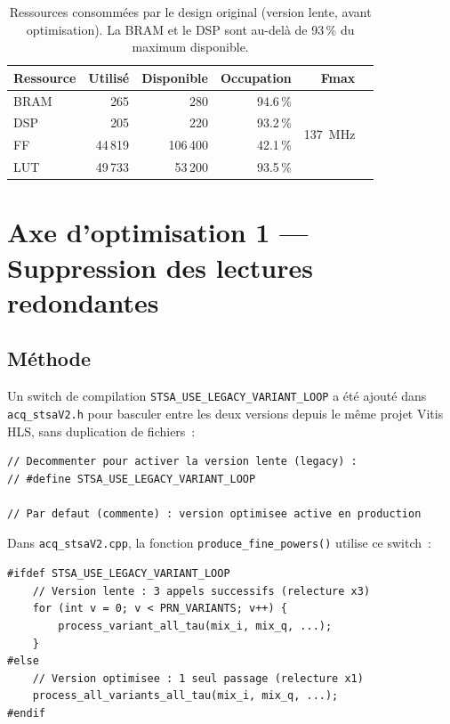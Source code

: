 \documentclass[11pt,a4paper]{article}
\begin{document}
\begin{table}[H]
\centering
\renewcommand{\arraystretch}{1.3}
\begin{tabular}{lrrrrl}
\toprule
\textbf{Ressource} & \textbf{Utilisé} & \textbf{Disponible} & \textbf{Occupation} & \textbf{Fmax} \\
\midrule
BRAM & 265 & 280 & 94.6\,\% & \multirow{4}{*}{137~MHz} \\
DSP  & 205 & 220 & 93.2\,\% & \\
FF   & 44\,819 & 106\,400 & 42.1\,\% & \\
LUT  & 49\,733 & 53\,200 & 93.5\,\% & \\
\bottomrule
\end{tabular}
\caption{Ressources consommées par le design original (version lente, avant optimisation). La BRAM et le DSP sont au-delà de 93\,\% du maximum disponible.}
\end{table}

\section{Axe d'optimisation 1 --- Suppression des lectures redondantes}
\label{sec:axe1}

\subsection{Méthode}

Un switch de compilation \texttt{STSA\_USE\_LEGACY\_VARIANT\_LOOP} a été ajouté dans \texttt{acq\_stsaV2.h} pour basculer entre les deux versions depuis le même projet Vitis HLS, sans duplication de fichiers~:

\begin{lstlisting}[caption={Switch dans acq\_stsaV2.h}]
// Decommenter pour activer la version lente (legacy) :
// #define STSA_USE_LEGACY_VARIANT_LOOP

// Par defaut (commente) : version optimisee active en production
\end{lstlisting}

Dans \texttt{acq\_stsaV2.cpp}, la fonction \texttt{produce\_fine\_powers()} utilise ce switch~:

\begin{lstlisting}[caption={Switch dans produce\_fine\_powers()}]
#ifdef STSA_USE_LEGACY_VARIANT_LOOP
    // Version lente : 3 appels successifs (relecture x3)
    for (int v = 0; v < PRN_VARIANTS; v++) {
        process_variant_all_tau(mix_i, mix_q, ...);
    }
#else
    // Version optimisee : 1 seul passage (relecture x1)
    process_all_variants_all_tau(mix_i, mix_q, ...);
#endif
\end{lstlisting}
\end{document}
